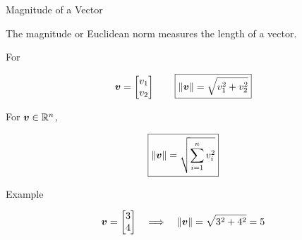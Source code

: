 \begin{frame}{Magnitude of a Vector}

The magnitude or Euclidean norm measures the length of a vector.

For
\vspace{-0.5cm}

\begin{center}

\[
\bm{v}
=
\begin{bmatrix}
v_1\\
v_2
\end{bmatrix}
\qquad
\boxed{
\|\bm{v}\|
=
\sqrt{v_1^2+v_2^2}
}
\]

\end{center}

\vspace{-0.5cm}

\noindent For $\bm{v}\in\mathbb{R}^n$,

\begin{center}

\[
\boxed{
\|\bm{v}\|
=
\sqrt{
\sum_{i=1}^{n} v_i^2
}
}
\]

\end{center}

\vspace{-0.2cm}

\begin{exampleblock}{Example}

\[
\bm{v}
=
\begin{bmatrix}
3\\
4
\end{bmatrix}
\quad\Longrightarrow\quad
\|\bm{v}\|
=
\sqrt{3^2+4^2}
=
5
\]

\end{exampleblock}

\end{frame}



